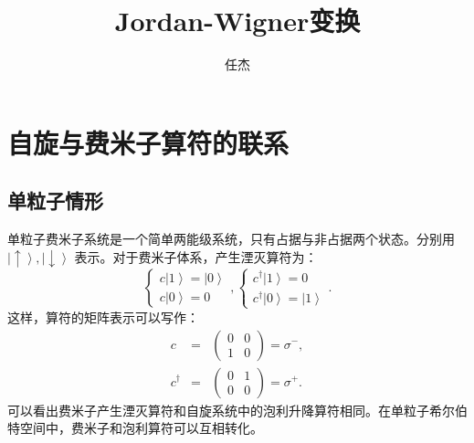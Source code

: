 \documentclass[10pt,UTF8]{ctexart}
\begin{document}
\title{Jordan-Wigner变换}
\author{任杰}
\date{}

\maketitle

\section*{自旋与费米子算符的联系}
\subsection*{单粒子情形}
\noindent 单粒子费米子系统是一个简单两能级系统，只有占据与非占据两个状态。分别用 $\left|\uparrow\right\rangle ,\left|\downarrow\right\rangle$ 表示。对于费米子体系，产生湮灭算符为：
\begin{equation}
	\begin{cases}
		c\left|1\right\rangle =\left|0\right\rangle \\ 
		c\left|0\right\rangle =0
	\end{cases},
	\begin{cases}
		c^{\dagger}\left|1\right\rangle =0 \\ 
		c^{\dagger}\left|0\right\rangle =\left|1\right\rangle
	\end{cases}.
\end{equation}
这样，算符的矩阵表示可以写作：
\begin{eqnarray}
	c &=& \left(
	\begin{array}{cc} 
		0 & 0\\ 
		1 & 0 
	\end{array}
	\right)=\sigma^{-}, \\
	c^{\dagger} &=& \left(
	\begin{array}{cc} 
		0 & 1\\ 
		0 & 0 
	\end{array}\right)=\sigma^{+}.
\end{eqnarray}
可以看出费米子产生湮灭算符和自旋系统中的泡利升降算符相同。在单粒子希尔伯特空间中，费米子和泡利算符可以互相转化。
\end{document}
